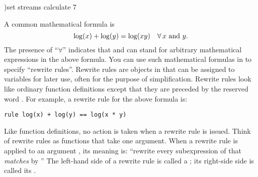 \begin{discard}
\begin{noOutputXtc}
\begin{xtccomment}
\end{xtccomment}
\begin{spadsrc}
)set streams calculate 7
\end{spadsrc}
\end{noOutputXtc}
\end{discard}


A common mathematical formula is
\begin{displaymath}
\log(x) + \log(y) = \log(x y) \quad\forall \, x \hbox{\ and\ } y.
\end{displaymath}
The presence of
``$\forall$''
indicates that  and  can stand for arbitrary mathematical
expressions in the above formula.
You can use such mathematical formulas in \Language{} to specify ``rewrite
rules''.
Rewrite rules are objects in \Language{} that can be assigned to variables for
later use, often for the purpose of simplification.
Rewrite rules look like ordinary function definitions except that they are
preceded by the reserved word .
For example, a rewrite rule for the above formula is:
\begin{verbatim}
rule log(x) + log(y) == log(x * y)
\end{verbatim}
Like function definitions, no action is taken when a rewrite rule is issued.
Think of rewrite rules as functions that take one argument.
When a rewrite rule  is applied to an argument , its
meaning is: ``rewrite every subexpression of  that {\it matches}
 by ''
The left-hand side of a rewrite rule is called a ; its
right-side side is called its .

